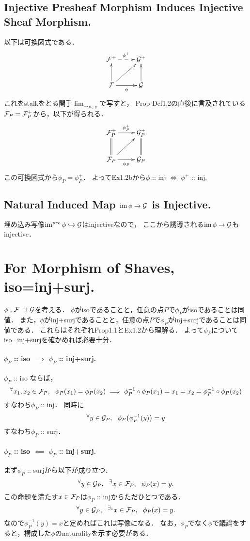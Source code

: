 \documentclass[a4paper]{jsarticle}
\begin{document}
    \subsection{Injective Presheaf Morphism Induces Injective Sheaf Morphism.}
    以下は可換図式である．
    \[
    \xymatrix
    {
        \shF^+ \ar@{-->}[r]^{\phi^+} & \shG^+ \\
        \shF \ar[u] \ar[r]_-{\phi} \ar[ur]& \shG \ar[u]
    }
    \]
    これをstalkをとる関手$\lim_{\to_{P \in U}}$で写すと，
    Prop-Def1.2の直後に言及されている$\mathcal{F}_P=\mathcal{F}_P^+$から，以下が得られる．
    \[
    \xymatrix
    {
        \shF_P^+ \ar[r]^{\phi_P^+} & \shG_P^+ \\
        \shF_P \ar@{=}[u] \ar[r]_-{\phi_P} \ar[ur]& \shG_P \ar@{=}[u]
    }
    \]
    この可換図式から$\phi_P=\phi_P^+$．
    よってEx1.2bから$\phi$ :: inj $\iff$ $\phi^+$ :: inj.

    \subsection{Natural Induced Map $\operatorname{im} \phi \to \mathcal{G}$ is Injective.}
    埋め込み写像$\operatorname{im}^{pre} \phi \hookrightarrow \mathcal{G}$はinjectiveなので，
    ここから誘導される$\operatorname{im} \phi \to \mathcal{G}$もinjective．

\section{For Morphism of Shaves, iso=inj+surj.} %
    $\phi: \mathcal{F} \to \mathcal{G}$を考える．
    $\phi$がisoであることと，任意の点$P$で$\phi_P$がisoであることは同値．
    また，$\phi$がinj+surjであることと，任意の点$P$で$\phi_P$がinj+surjであることは同値である．
    これらはそれぞれProp1.1とEx1.2から理解る．
    よって$\phi_P$についてiso=inj+surjを確かめれば必要十分．
    
    \paragraph{$\phi_P$ :: iso $\implies$ $\phi_P$ :: inj+surj.}
    $\phi_P$ :: iso ならば，
    \[
        {}^{\forall} x_1, x_2 \in \mathcal{F}_P,~~
        \phi_P(x_1)=\phi_P(x_2)
        \implies
        \phi_P^{-1} \circ \phi_P(x_1)=x_1=x_2=\phi_P^{-1} \circ \phi_P(x_2)
        \label{prop:ex15-inj}
    \]
    すなわち$\phi_P$ :: inj．
    同時に
    \[ {}^{\forall} y \in \mathcal{G}_P,~~ \phi_P \big( \phi_P^{-1}(y) \big)=y \]
    すなわち$\phi_P$ :: surj．

    \paragraph{$\phi_P$ :: iso $\impliedby$ $\phi_P$ :: inj+surj.}
    まず$\phi_P$ :: surjから以下が成り立つ．
    \[ {}^{\forall} y \in \mathcal{G}_P,~~ {}^{\exists} x \in \mathcal{F}_P,~~ \phi_P(x)=y. \]
    この命題を満たす$x \in \mathcal{F}_P$は$\phi_P$ :: injからただひとつである．
    \[ {}^{\forall} y \in \mathcal{G}_P,~~ {}^{\exists_1} x \in \mathcal{F}_P,~~ \phi_P(x)=y. \]
    なので$\phi_P^{-1}(y)=x$と定めればこれは写像になる．
    なお，$\phi_P$でなく$\phi$で議論をすると，構成した$\phi$のnaturalityを示す必要がある．
\end{document}
